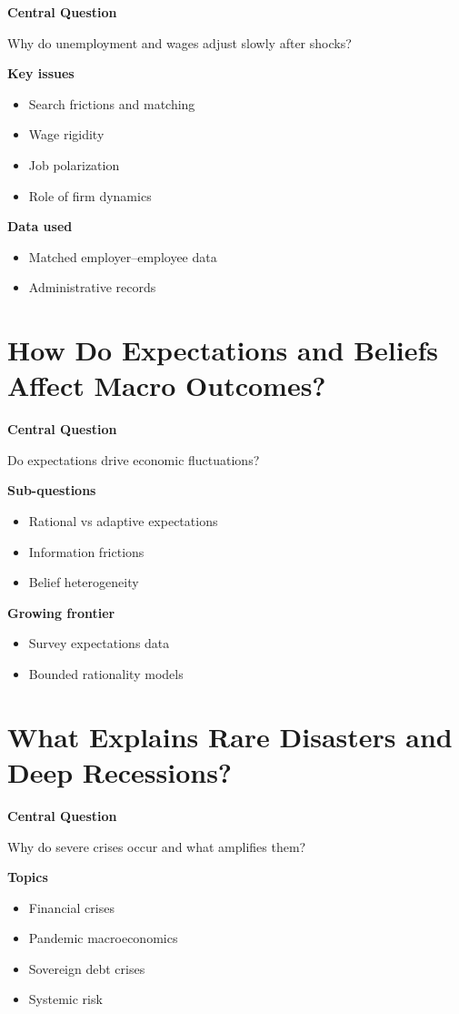 \documentclass[12pt]{article}
\begin{document}
\textbf{Central Question}

Why do unemployment and wages adjust slowly after shocks?

\textbf{Key issues}
\begin{itemize}
\item Search frictions and matching
\item Wage rigidity
\item Job polarization
\item Role of firm dynamics
\end{itemize}

\textbf{Data used}
\begin{itemize}
\item Matched employer--employee data
\item Administrative records
\end{itemize}

\section{How Do Expectations and Beliefs Affect Macro Outcomes?}

\textbf{Central Question}

Do expectations drive economic fluctuations?

\textbf{Sub-questions}
\begin{itemize}
\item Rational vs adaptive expectations
\item Information frictions
\item Belief heterogeneity
\end{itemize}

\textbf{Growing frontier}
\begin{itemize}
\item Survey expectations data
\item Bounded rationality models
\end{itemize}

\section{What Explains Rare Disasters and Deep Recessions?}

\textbf{Central Question}

Why do severe crises occur and what amplifies them?

\textbf{Topics}
\begin{itemize}
\item Financial crises
\item Pandemic macroeconomics
\item Sovereign debt crises
\item Systemic risk
\end{itemize}
\end{document}
